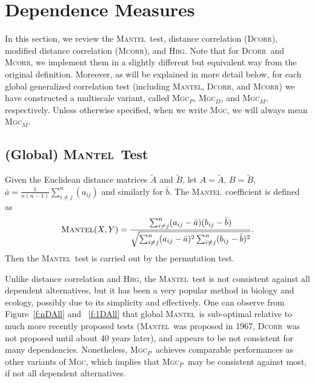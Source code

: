 \documentclass[11pt]{article}
\providecommand{\sct}[1]{{\normalfont\textsc{#1}}}
\newcommand{\Mgc}{\sct{Mgc}}
\newcommand{\Mgcp}{\sct{Mgc$_P$}}
\newcommand{\Mgcd}{\sct{Mgc$_D$}}
\newcommand{\Mgcm}{\sct{Mgc$_M$}}
\newcommand{\Hhg}{\sct{Hhg}}
\newcommand{\Dcorr}{\sct{Dcorr}}
\newcommand{\Mcorr}{\sct{Mcorr}}
\newcommand{\Mantel}{\sct{Mantel}}
\begin{document}
\clearpage
\section{Dependence Measures}
\label{appen:methods}

In this section, we review the \Mantel~test, distance correlation (\Dcorr), modified distance correlation (\Mcorr),  and  \Hhg. Note that for \Dcorr~and \Mcorr, we implement them in a slightly different but equivalent way from the original definition.  Moreover, as will be explained in more detail below, for each global generalized correlation test (including \Mantel, \Dcorr, and \Mcorr) we have constructed a multiscale variant, called \Mgcp, \Mgcd, and \Mgcm, respectively.  Unless otherwise specified, when we write \Mgc, we will always mean \Mgcm.

\subsection{(Global) \Mantel~Test}
\label{appen:mantel}
Given the Euclidean distance matrices $\tilde{A}$ and $\tilde{B}$, let  $A=\tilde{A}$, $B=\tilde{B}$, $\bar{a}=\frac{1}{n(n-1)}\sum_{i \neq j}^{n}(a_{ij})$ and similarly for $\bar{b}$.
The \Mantel~coefficient \cite{Mantel1967} is defined as
\begin{equation*}
\Mantel(X,Y)=\frac{\sum_{i \neq j}^{n}(a_{ij}-\bar{a})(b_{ij}-\bar{b})}{\sqrt{\sum_{i \neq j}^{n}(a_{ij}-\bar{a})^2 \sum_{i \neq j}^{n}(b_{ij}-\bar{b})^2}}.
\end{equation*}
Then the \Mantel~test is carried out by the permutation test.

Unlike distance correlation and \Hhg, the \Mantel~test is not consistent against all dependent alternatives, but it has been a very popular method in biology and ecology, possibly due to its simplicity and effectively. One can observe from Figure~\ref{f:nDAll} and ~\ref{f:1DAll} that global \Mantel~is sub-optimal relative to much more recently proposed tests (\Mantel~was proposed in 1967, \Dcorr~was not proposed until about 40 years later), and appears to be not consistent for many dependencies. Nonetheless,  \Mgcp~achieves comparable performances as other variants of \Mgc, which implies that \Mgcp~may be consistent against most, if not all dependent alternatives.
\end{document}
